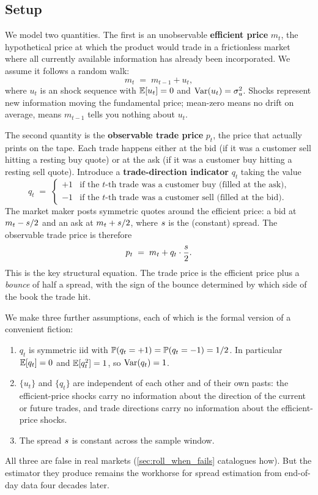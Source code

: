 \subsection{Setup}
\label{subsec:roll_setup}

We model two quantities. The first is an unobservable
\textbf{efficient price} $m_t$, the hypothetical price at which
the product would trade in a frictionless market where all
currently available information has already been incorporated.
We assume it follows a random walk:
\begin{equation}
  m_t \;=\; m_{t-1} + u_t,
  \label{eq:roll_efficient}
\end{equation}
where $u_t$ is an \iid{} shock sequence with $\mathbb{E}[u_t] = 0$ and
$\operatorname{Var}(u_t) = \sigma_u^2$. Shocks represent new information moving
the fundamental price; mean-zero means no drift on average, \iid{}
means $m_{t-1}$ tells you nothing about $u_t$.

The second quantity is the \textbf{observable trade price} $p_t$,
the price that actually prints on the tape. Each trade happens either at
the bid (if it was a customer sell hitting a resting buy quote) or
at the ask (if it was a customer buy hitting a resting sell
quote). Introduce a \textbf{trade-direction indicator} $q_t$
taking the value
\[
  q_t \;=\;
  \begin{cases}
    +1 & \text{if the $t$-th trade was a customer buy (filled at the ask),} \\
    -1 & \text{if the $t$-th trade was a customer sell (filled at the bid).}
  \end{cases}
\]
The market maker posts symmetric quotes around the efficient
price: a bid at $m_t - s/2$ and an ask at $m_t + s/2$,
where $s$ is the (constant) spread. The observable trade
price is therefore
\begin{equation}
  p_t \;=\; m_t + q_t \cdot \frac{s}{2}.
  \label{eq:roll_observed}
\end{equation}
This is the key structural equation. The trade price is the
efficient price plus a \emph{bounce} of half a spread, with the
sign of the bounce determined by which side of the book the trade
hit.

We make three further assumptions, each of which is the formal
version of a convenient fiction:
\begin{enumerate}
  \item $q_t$ is symmetric iid with $\mathbb{P}(q_t = +1) = \mathbb{P}(q_t = -1)
  = 1/2$. In particular $\mathbb{E}[q_t] = 0$ and $\mathbb{E}[q_t^2] = 1$, so
  $\operatorname{Var}(q_t) = 1$.
  \item $\{u_t\}$ and $\{q_t\}$ are independent of each other and
  of their own pasts: the efficient-price shocks carry no
  information about the direction of the current or future
  trades, and trade directions carry no information about the
  efficient-price shocks.
  \item The spread $s$ is constant across the sample
  window.
\end{enumerate}
All three are false in real markets (\cref{sec:roll_when_fails}
catalogues how). But the estimator they produce remains the
workhorse for spread estimation from end-of-day data four decades
later.

